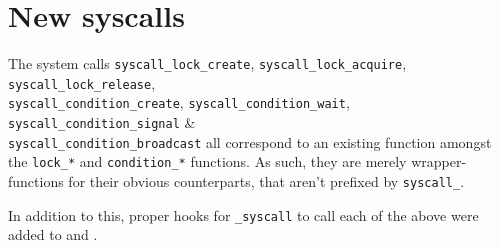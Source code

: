 \section{New syscalls}
The system calls 
\texttt{syscall\_lock\_create}, 
\texttt{syscall\_lock\_acquire}, 
\texttt{syscall\_lock\_release}, \\
\texttt{syscall\_condition\_create}, 
\texttt{syscall\_condition\_wait}, 
\texttt{syscall\_condition\_signal} \& \\ 
\texttt{syscall\_condition\_broadcast} all correspond to an existing function 
amongst the \texttt{lock\_*} and \texttt{condition\_*} functions. As such, they 
are merely wrapper-functions for their obvious counterparts, that aren't prefixed 
by \texttt{syscall\_}.

In addition to this, proper hooks for \texttt{\_syscall} to call each of the above were
added to  and .
